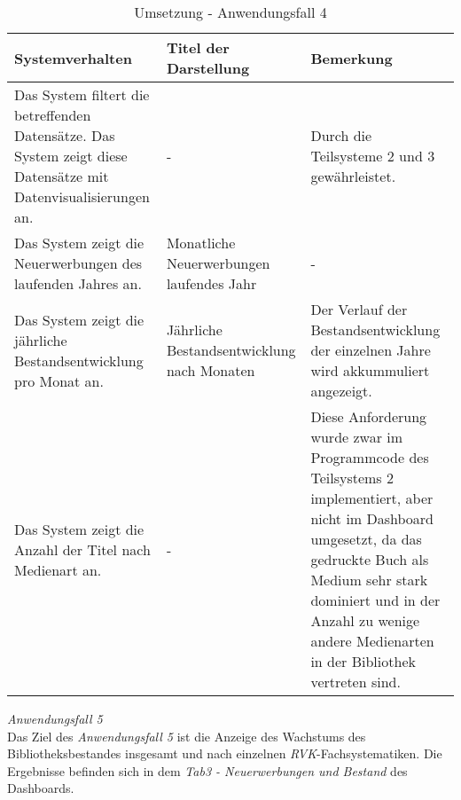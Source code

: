 \begingroup
    \setlength{\tabcolsep}{12pt} %
    \renewcommand{\arraystretch}{1.5} 
    \begin{table}[h]
        \centering
        \Large
        \begin{adjustbox}{max width=\textwidth}
        \begin{tabular}{p{}p{}p{}}
           \toprule
           Systemverhalten        &Titel der Darstellung&Bemerkung\\
           \midrule
           Das System filtert die betreffenden Datensätze. Das System zeigt diese Datensätze mit Datenvisualisierungen an.&-&Durch die Teilsysteme 2  und 3 gewährleistet.\\
           Das System zeigt die Neuerwerbungen des laufenden Jahres an.&Monatliche Neuerwerbungen laufendes Jahr&-\\
           Das System zeigt die jährliche Bestandsentwicklung pro Monat an.&Jährliche Bestandsentwicklung nach Monaten&Der Verlauf der Bestandsentwicklung der einzelnen Jahre wird akkummuliert angezeigt.\\
           Das System zeigt die Anzahl der Titel nach Medienart an.&-&Diese Anforderung wurde zwar im Programmcode des Teilsystems 2 implementiert, aber nicht im Dashboard umgesetzt, da das gedruckte Buch als Medium sehr stark dominiert und in der Anzahl zu wenige andere Medienarten in der Bibliothek vertreten sind.\\

        \bottomrule
        \end{tabular}
        \end{adjustbox}
        \caption{%
            Umsetzung - Anwendungsfall 4
        }
        \label{tab:Anwendungsfall 4 - Umgesetzte Anforderungen}
        \end{table}
\endgroup

\clearpage
\noindent
\textit{Anwendungsfall 5}\\
Das Ziel des \textit{Anwendungsfall 5} ist die Anzeige des Wachstums des Bibliotheksbestandes insgesamt und nach einzelnen \textit{\acrshort{RVK}}-Fachsystematiken.
Die Ergebnisse befinden sich in dem \textit{Tab3 - Neuerwerbungen und Bestand} des Dashboards.

